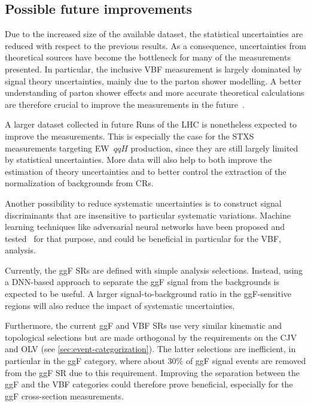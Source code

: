 \subsection{Possible future improvements}
Due to the increased size of the available dataset, the statistical uncertainties are reduced with respect to the previous results.
As a consequence, uncertainties from theoretical sources have become the bottleneck for many of the measurements presented.
In particular, the inclusive VBF measurement is largely dominated by signal theory uncertainties, mainly due to the parton shower modelling.
A better understanding of parton shower effects and more accurate theoretical calculations are therefore crucial to improve the measurements in the future~\cite{Jger2020}. 

A larger dataset collected in future Runs of the LHC is nonetheless expected to improve the measurements. This is especially the case for the STXS measurements targeting EW~$qqH$ production, since they are still largely limited by statistical uncertainties. 
More data will also help to both improve the estimation of theory uncertainties and to better control the extraction of the normalization of backgrounds from CRs. 

Another possibility to reduce systematic uncertainties is to construct signal discriminants that are insensitive to particular systematic variations. Machine learning techniques like adversarial neural networks have been proposed and tested~\cite{Englert2019,adversarialClavijoJoseM} for that purpose, and could be beneficial in particular for the VBF, \HWW analysis.

Currently, the ggF SRs are defined with simple analysis selections. Instead, using a DNN-based approach to separate the ggF signal from the backgrounds is expected to be useful. 
A larger signal-to-background ratio in the ggF-sensitive regions will also reduce the impact of systematic uncertainties. 

Furthermore, the current ggF and VBF \TwoJet SRs use very similar kinematic and topological selections but are made orthogonal by the requirements on the CJV and OLV (see \cref{sec:event-categorization}). The latter selections are inefficient, in particular in the ggF \TwoJet category, where about 30\% of ggF signal events are removed from the ggF SR due to this requirement. Improving the separation between the ggF \TwoJet and the VBF \TwoJet categories could therefore prove beneficial, especially for the ggF \TwoJet cross-section measurements. 

